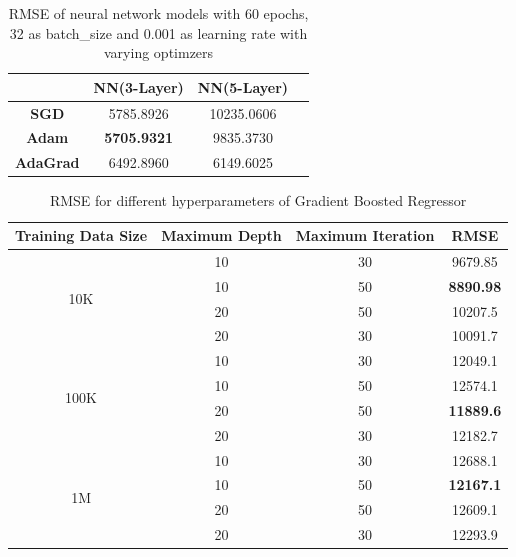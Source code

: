 \documentclass[10pt,twocolumn,letterpaper]{article}
\begin{document}
\begin{table}[t!]
\small
\begin{center}
\begin{tabular}{|c|c|c|c|}
\hline
     & \textbf{NN(3-Layer)} & \textbf{NN(5-Layer)} \\ \hline
\textbf{SGD} & 5785.8926 & 10235.0606 \\ \hline
\textbf{Adam} & \textbf{5705.9321} & 9835.3730 \\ \hline
\textbf{AdaGrad} & 6492.8960 & 6149.6025 \\ \hline
\end{tabular}
\end{center}
\caption{RMSE of neural network models with 60 epochs, 32 as batch\_size and 0.001 as learning rate with varying optimzers}
\end{table}

\begin{table}[t!]
\small
\begin{center}
\begin{tabular}{|c|c|c|c|}
\hline  \textbf{Training Data Size} & \textbf{Maximum Depth} & \textbf{Maximum Iteration} & \textbf{RMSE}  \\ \hline
\multirow{4}{*}{10K}  & 10 & 30 & 9679.85  \\ 
  & 10 & 50 & \textbf{8890.98}  \\
  & 20 & 50 & 10207.5  \\
  & 20 & 30 & 10091.7  \\ \hline
\multirow{4}{*}{100K}  & 10 & 30 & 12049.1  \\ 
  & 10 & 50 & 12574.1  \\
  & 20 & 50 & \textbf{11889.6}  \\
  & 20 & 30 & 12182.7  \\ \hline
\multirow{4}{*}{1M}  & 10 & 30 & 12688.1 \\
  & 10 & 50 & \textbf{12167.1}  \\
  & 20 & 50 & 12609.1  \\
  & 20 & 30 & 12293.9  \\ \hline
\end{tabular}
\end{center}
\caption{RMSE for different hyperparameters of Gradient Boosted Regressor}
\label{pairwise-summary-table}
\end{table}
\end{document}
